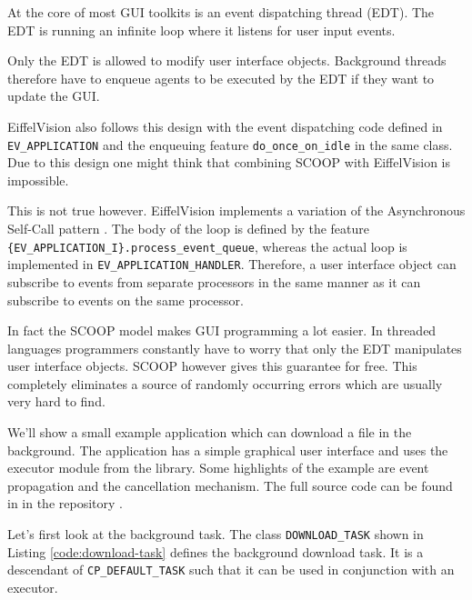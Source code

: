 At the core of most GUI toolkits is an event dispatching thread (EDT).
The EDT is running an infinite loop where it listens for user input events.

Only the EDT is allowed to modify user interface objects.
Background threads therefore have to enqueue agents to be executed by the EDT if they want to update the GUI.

EiffelVision also follows this design with the event dispatching code defined in \lstinline!EV_APPLICATION! and the enqueuing feature \lstinline!do_once_on_idle! in the same class.
Due to this design one might think that combining SCOOP with EiffelVision is impossible.

This is not true however.
EiffelVision implements a variation of the Asynchronous Self-Call pattern .
The body of the loop is defined by the feature \lstinline!{EV_APPLICATION_I}.process_event_queue!, whereas the actual loop is implemented in \lstinline!EV_APPLICATION_HANDLER!.
Therefore, a user interface object can subscribe to events from separate processors in the same manner as it can subscribe to events on the same processor.

In fact the SCOOP model makes GUI programming a lot easier.
In threaded languages programmers constantly have to worry that only the EDT manipulates user interface objects.
SCOOP however gives this guarantee for free.
This completely eliminates a source of randomly occurring errors which are usually very hard to find.

We'll show a small example application which can download a file in the background.
The application has a simple graphical user interface and uses the executor module from the library.
Some highlights of the example are event propagation and the cancellation mechanism.
The full source code can be found in  in the repository \cite{web:repository}.

Let's first look at the background task.
The class \lstinline!DOWNLOAD_TASK! shown in Listing \ref{code:download-task} defines the background download task.
It is a descendant of \lstinline!CP_DEFAULT_TASK! such that it can be used in conjunction with an executor.

